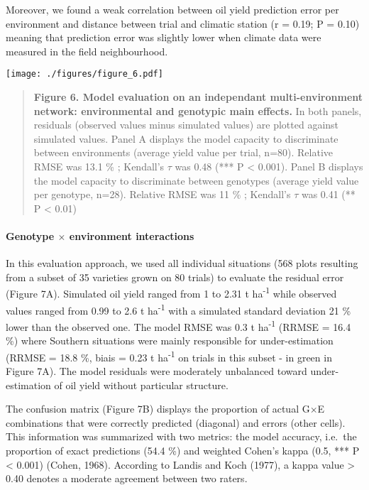 \documentclass[a4paper]{article}
\let\oldparagraph\paragraph
\renewcommand{\paragraph}[1]{\oldparagraph{#1}\mbox{}}
\begin{document}
Moreover, we found a weak correlation between oil yield prediction error
per environment and distance between trial and climatic station (r =
0.19; P = 0.10) meaning that prediction error was slightly lower when
climate data were measured in the field neighbourhood.

\texttt{[image: ./figures/figure\_6.pdf]}

\begin{quote}
\textbf{Figure 6. Model evaluation on an independant multi-environment
network: environmental and genotypic main effects.} In both panels,
residuals (observed values minus simulated values) are plotted against
simulated values. Panel A displays the model capacity to discriminate
between environments (average yield value per trial, n=80). Relative
RMSE was 13.1 \% ; Kendall's \(\tau\) was 0.48 (*** P \textless{}
0.001). Panel B displays the model capacity to discriminate between
genotypes (average yield value per genotype, n=28). Relative RMSE was 11
\% ; Kendall's \(\tau\) was 0.41 (** P \textless{} 0.01)
\end{quote}

\paragraph{\texorpdfstring{Genotype \(\times\) environment
interactions}{Genotype \textbackslash{}times environment interactions}}\label{genotype-times-environment-interactions}

In this evaluation approach, we used all individual situations (568
plots resulting from a subset of 35 varieties grown on 80 trials) to
evaluate the residual error (Figure 7A). Simulated oil yield ranged from
1 to 2.31 t ha\textsuperscript{-1} while observed values ranged from
0.99 to 2.6 t ha\textsuperscript{-1} with a simulated standard deviation
21 \% lower than the observed one. The model RMSE was 0.3 t
ha\textsuperscript{-1} (RRMSE = 16.4 \%) where Southern situations were
mainly responsible for under-estimation (RRMSE = 18.8 \%, biais = 0.23 t
ha\textsuperscript{-1} on trials in this subset - in green in Figure
7A). The model residuals were moderately unbalanced toward
under-estimation of oil yield without particular structure.

The confusion matrix (Figure 7B) displays the proportion of actual
G\(\times\)E combinations that were correctly predicted (diagonal) and
errors (other cells). This information was summarized with two metrics:
the model accuracy, i.e.~the proportion of exact predictions (54.4 \%)
and weighted Cohen's kappa (0.5, *** P \textless{} 0.001) (Cohen, 1968).
According to Landis and Koch (1977), a kappa value \textgreater{} 0.40
denotes a moderate agreement between two raters.
\end{document}

